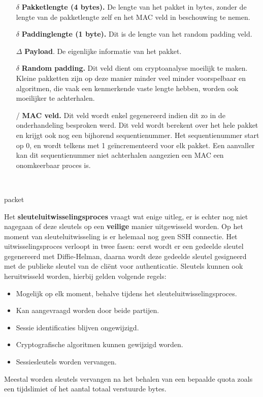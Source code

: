 \documentclass{report}
\begin{document}
	\begin{itemize}
		\item[$\delta$] \textbf{Pakketlengte (4 bytes).} De lengte van het pakket in bytes, zonder de lengte van de pakketlengte zelf en het MAC veld in beschouwing te nemen.
		\item[$\delta$] \textbf{Paddinglengte (1 byte).} Dit is de lengte van het random padding veld.
		\item[$\Delta$] \textbf{Payload}. De eigenlijke informatie van het pakket.
		\item[$\delta$] \textbf{Random padding.} Dit veld dient om cryptoanalyse moeilijk te maken. Kleine pakketten zijn op deze manier minder veel minder voorspelbaar en algoritmen, die vaak een kenmerkende vaste lengte hebben, worden ook moeilijker te achterhalen.
		\item[/] \textbf{MAC veld.} Dit veld wordt enkel gegenereerd indien dit zo in de onderhandeling besproken werd. Dit veld wordt berekent over het hele pakket en krijgt ook nog een bijhorend sequentienummer. Het sequentienummer start op 0, en wordt telkens met 1 geïncrementeerd voor elk pakket. Een aanvaller kan dit sequentienummer niet achterhalen aangezien een MAC een onomkeerbaar proces is.
	\end{itemize}
	\begin{bytefield}[bitwidth = 1.5em, leftcurly = .]{16}
		 \\
		\begin{leftwordgroup}{packet}
		\end{leftwordgroup}
	\end{bytefield}

	Het \textbf{sleuteluitwisselingsproces} vraagt wat enige uitleg, er is echter nog niet nagegaan of deze sleutels op een \textbf{veilige} manier uitgewisseld worden. Op het moment van sleuteluitwisseling is er helemaal nog geen SSH connectie. Het uitwisselingsproces verloopt in twee fasen: eerst wordt er een gedeelde sleutel gegenereerd met Diffie-Helman, daarna wordt deze gedeelde sleutel gesigneerd met de publieke sleutel van de cliënt voor authenticatie. Sleutels kunnen ook heruitwisseld worden, hierbij gelden volgende regels:
	\begin{itemize}
		\item Mogelijk op elk moment, behalve tijdens het sleuteluitwisselingsproces.
		\item Kan aangevraagd worden door beide partijen.
		\item Sessie identificaties blijven ongewijzigd.
		\item Cryptografische algoritmen kunnen gewijzigd worden.
		\item Sessiesleutels worden vervangen.
	\end{itemize}
	Meestal worden sleutels vervangen na het behalen van een bepaalde quota zoals een tijdslimiet of het aantal totaal verstuurde bytes.
\end{document}
